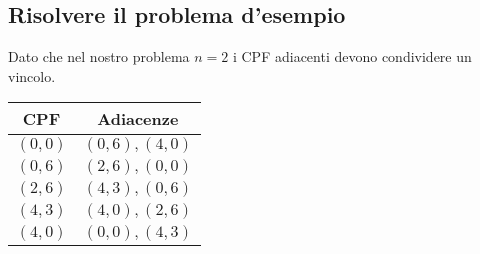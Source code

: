 \documentclass{article}
\begin{document}
    \subsection{Risolvere il problema d'esempio}
      \begin{minipage}{0.55\textwidth}
        Dato che nel nostro problema $n=2$ i CPF adiacenti devono condividere un vincolo.
      \end{minipage}
      \hfill
      \begin{minipage}{0.30\textwidth}
          \begin{tabular}{|c|c|}
            \hline
            \textbf{CPF} & \textbf{Adiacenze} \\
            \hline
            $(0,0)$ & $(0,6),(4,0)$ \\
            $(0,6)$ & $(2,6),(0,0)$ \\
            $(2,6)$ & $(4,3),(0,6)$ \\
            $(4,3)$ & $(4,0),(2,6)$ \\
            $(4,0)$ & $(0,0),(4,3)$ \\
            \hline
          \end{tabular}
      \end{minipage}
\end{document}
